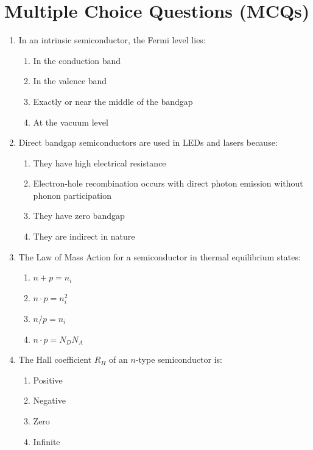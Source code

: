 \section{Multiple Choice Questions (MCQs)}

\begin{enumerate}
    \item In an intrinsic semiconductor, the Fermi level lies:
    \begin{enumerate}
        \item In the conduction band
        \item In the valence band
        \item Exactly or near the middle of the bandgap
        \item At the vacuum level
    \end{enumerate}
    
    \item Direct bandgap semiconductors are used in LEDs and lasers because:
    \begin{enumerate}
        \item They have high electrical resistance
        \item Electron-hole recombination occurs with direct photon emission without phonon participation
        \item They have zero bandgap
        \item They are indirect in nature
    \end{enumerate}
    
    \item The Law of Mass Action for a semiconductor in thermal equilibrium states:
    \begin{enumerate}
        \item $n + p = n_i$
        \item $n \cdot p = n_i^2$
        \item $n / p = n_i$
        \item $n \cdot p = N_D N_A$
    \end{enumerate}
    
    \item The Hall coefficient $R_H$ of an $n$-type semiconductor is:
    \begin{enumerate}
        \item Positive
        \item Negative
        \item Zero
        \item Infinite
    \end{enumerate}
    

\end{enumerate}
